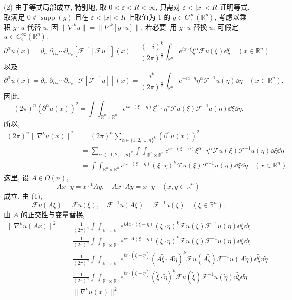 (2) 由于等式局部成立, 特别地, 取 $0 < \varepsilon < R < \infty$, 只需对 $\varepsilon < |x| < R$ 证明等式. 取满足 $0 \notin \operatorname{supp}(g)$ 且在 $\varepsilon < |x| < R$ 上取值为 1 的 $g \in C_{\mathrm{c}}^{\infty}(\mathbb{R}^{n})$, 考虑以乘积 $g \cdot u$ 代替 $u$. 因 $\|\nabla^{k}u\| = \|\nabla^{k}[g \cdot u]\|$, 若必要, 用 $g \cdot u$ 替换 $u$, 可假定 $u \in C_{\mathrm{c}}^{\infty}(\mathbb{R}^{n})$.
\[
\partial^{\alpha}u(x) = \partial_{\alpha_{1}}\partial_{\alpha_{2}}\cdots\partial_{\alpha_{k}}[\mathcal{F}^{-1}[\mathcal{F}u]](x) = \frac{(-i)^{k}}{(2\pi)^{\frac{n}{2}}}\int_{\mathbb{R}^{n}}e^{ix \cdot \xi}\xi^{\alpha}\mathcal{F}u(\xi)\dd\xi \quad (x \in \mathbb{R}^{n})
\]
以及
\[
\partial^{\alpha}u(x) = \partial_{\alpha_{1}}\partial_{\alpha_{2}}\cdots\partial_{\alpha_{k}}[\mathcal{F}[\mathcal{F}^{-1}u]](x) = \frac{i^{k}}{(2\pi)^{\frac{n}{2}}}\int_{\mathbb{R}^{n}}e^{-ix \cdot \eta}\eta^{\alpha}\mathcal{F}^{-1}u(\eta)\dd\eta \quad (x \in \mathbb{R}^{n}).
\]
因此,
\[
(2\pi)^{n}(\partial^{\alpha}u(x))^{2} = \int\int_{\mathbb{R}^{n} \times \mathbb{R}^{n}}e^{ix \cdot (\xi-\eta)}\xi^{\alpha} \cdot \eta^{\alpha}\mathcal{F}u(\xi)\mathcal{F}^{-1}u(\eta)\dd\xi\dd\eta.
\]
所以,
\begin{align*}
(2\pi)^{n}\|\nabla^{k}u(x)\|^{2} &= (2\pi)^{n}\sum_{\alpha \in \{1,2,\ldots,n\}^{k}}(\partial^{\alpha}u(x))^{2} \\
&= \sum_{\alpha \in \{1,2,\ldots,n\}^{k}}\int\int_{\mathbb{R}^{n} \times \mathbb{R}^{n}}e^{ix \cdot (\xi-\eta)}\xi^{\alpha} \cdot \eta^{\alpha}\mathcal{F}u(\xi)\mathcal{F}^{-1}u(\eta)\dd\xi\dd\eta \\
&= \int\int_{\mathbb{R}^{n} \times \mathbb{R}^{n}}e^{ix \cdot (\xi-\eta)}(\xi \cdot \eta)^{k}\mathcal{F}u(\xi)\mathcal{F}^{-1}u(\eta)\dd\xi\dd\eta \quad (x \in \mathbb{R}^{n}).
\end{align*}
这里, 设 $A \in O(n)$,
\[
Ax \cdot y = x \cdot {}^{\mathrm{t}}Ay, \quad Ax \cdot Ay = x \cdot y \quad (x, y \in \mathbb{R}^{n})
\]
成立. 由 (1),
\[
\mathcal{F}u(A\xi) = \mathcal{F}u(\xi), \quad \mathcal{F}^{-1}u(A\xi) = \mathcal{F}^{-1}u(\xi) \quad (\xi \in \mathbb{R}^{n}).
\]
由 $A$ 的正交性与变量替换,
\begin{align*}
\|\nabla^{k}u(Ax)\|^{2} &= \frac{1}{(2\pi)^{n}}\int\int_{\mathbb{R}^{n} \times \mathbb{R}^{n}}e^{iAx \cdot (\xi-\eta)}(\xi \cdot \eta)^{k}\mathcal{F}u(\xi)\mathcal{F}^{-1}u(\eta)\dd\xi\dd\eta \\
&= \frac{1}{(2\pi)^{n}}\int\int_{\mathbb{R}^{n} \times \mathbb{R}^{n}}e^{ix \cdot A(\xi-\eta)}(\xi \cdot \eta)^{k}\mathcal{F}u(\xi)\mathcal{F}^{-1}u(\eta)\dd\xi\dd\eta \\
&= \frac{1}{(2\pi)^{n}}\int\int_{\mathbb{R}^{n} \times \mathbb{R}^{n}}e^{ix \cdot (\tilde{\xi}-\tilde{\eta})}(A\tilde{\xi} \cdot A\tilde{\eta})^{k}\mathcal{F}u(A\tilde{\xi})\mathcal{F}^{-1}u(A\tilde{\eta})\dd\tilde{\xi}\dd\tilde{\eta} \\
&= \frac{1}{(2\pi)^{n}}\int\int_{\mathbb{R}^{n} \times \mathbb{R}^{n}}e^{ix \cdot (\tilde{\xi}-\tilde{\eta})}(\tilde{\xi} \cdot \tilde{\eta})^{k}\mathcal{F}u(\tilde{\xi})\mathcal{F}^{-1}u(\tilde{\eta})\dd\tilde{\xi}\dd\tilde{\eta} \\
&= \|\nabla^{k}u(x)\|^{2}.
\end{align*}
